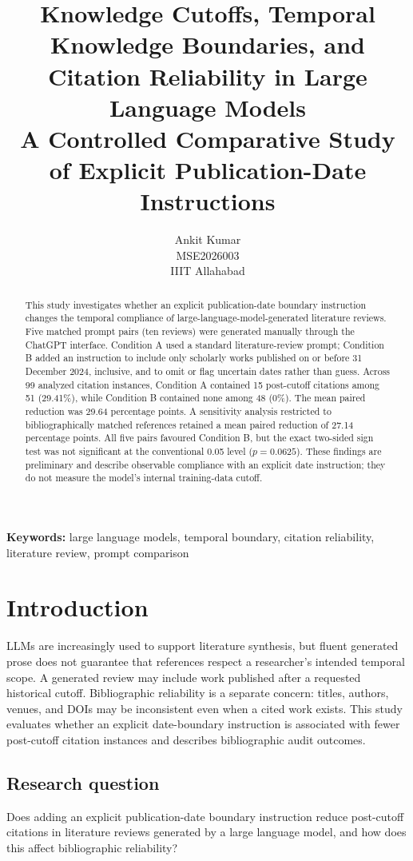 \documentclass[11pt,a4paper]{article}
\title{Knowledge Cutoffs, Temporal Knowledge Boundaries, and Citation Reliability in Large Language Models\\\large A Controlled Comparative Study of Explicit Publication-Date Instructions}
\author{Ankit Kumar\\MSE2026003\\IIIT Allahabad}
\date{}
\begin{document}
\maketitle
\begin{abstract}
This study investigates whether an explicit publication-date boundary instruction changes the temporal compliance of large-language-model-generated literature reviews. Five matched prompt pairs (ten reviews) were generated manually through the ChatGPT interface. Condition A used a standard literature-review prompt; Condition B added an instruction to include only scholarly works published on or before 31 December 2024, inclusive, and to omit or flag uncertain dates rather than guess. Across 99 analyzed citation instances, Condition A contained 15 post-cutoff citations among 51 (29.41\%), while Condition B contained none among 48 (0\%). The mean paired reduction was 29.64 percentage points. A sensitivity analysis restricted to bibliographically matched references retained a mean paired reduction of 27.14 percentage points. All five pairs favoured Condition B, but the exact two-sided sign test was not significant at the conventional 0.05 level ($p=0.0625$). These findings are preliminary and describe observable compliance with an explicit date instruction; they do not measure the model's internal training-data cutoff.
\end{abstract}
\noindent\textbf{Keywords:} large language models, temporal boundary, citation reliability, literature review, prompt comparison

\section{Introduction}
LLMs are increasingly used to support literature synthesis, but fluent generated prose does not guarantee that references respect a researcher's intended temporal scope. A generated review may include work published after a requested historical cutoff. Bibliographic reliability is a separate concern: titles, authors, venues, and DOIs may be inconsistent even when a cited work exists. This study evaluates whether an explicit date-boundary instruction is associated with fewer post-cutoff citation instances and describes bibliographic audit outcomes.

\subsection{Research question}
Does adding an explicit publication-date boundary instruction reduce post-cutoff citations in literature reviews generated by a large language model, and how does this affect bibliographic reliability?
\end{document}

